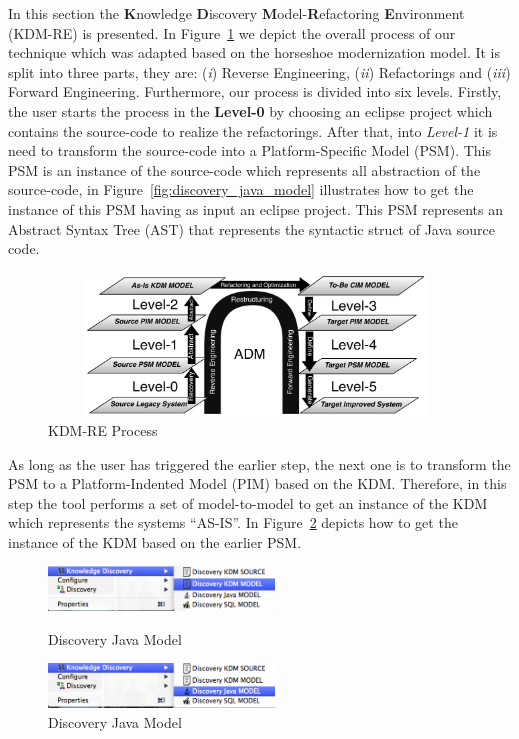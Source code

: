 In this section the \textbf{K}nowledge \textbf{D}iscovery \textbf{M}odel-\textbf{R}efactoring \textbf{E}nvironment (KDM-RE) is presented. 
In Figure~\ref{fig:process} we depict the overall process of our technique which was adapted based on the horseshoe modernization model. 
It is split into three parts, they are: 
(\textit{i}) Reverse Engineering, 
(\textit{ii}) Refactorings and 
(\textit{iii}) Forward Engineering. 
Furthermore, our process is divided into six levels. 
Firstly, the user starts the process in the \textbf{Level-0} by choosing an eclipse project which contains the source-code to realize the refactorings.  
After that, into \textit{Level-1} it is need to transform the source-code into a Platform-Specific Model (PSM). 
This PSM is an instance of the source-code which represents all abstraction of the source-code, in Figure~\ref{fig:discovery_java_model} illustrates how to get the instance of this PSM having as input an eclipse project. 
This PSM represents an Abstract Syntax Tree (AST) that represents the syntactic struct of Java source code.

\begin{figure}[!ht]
\centering
  \includegraphics[width=11cm, height=3.8cm]{figure/processoDaFerramenta}
\caption{KDM-RE Process}
\label{fig:process}
\end{figure} 

As long as the user has triggered the earlier step, the next one is to transform the PSM to a Platform-Indented Model (PIM) based on the KDM. 
Therefore, in this step the tool performs a set of model-to-model to get an instance of the KDM which represents the systems ``AS-IS''. 
In Figure~\ref{fig:discovery_kdm_model} depicts how to get the instance of the KDM based on the earlier PSM.

\begin{figure}
\centering
\begin{minipage}{.5\textwidth}
  \centering
  \includegraphics[width=6cm]{figure/discovery_kdm_model}
  \caption{Discovery Java Model}
  \label{fig:discovery_java_model}
\end{minipage}%
\begin{minipage}{.5\textwidth}
  \centering
  \includegraphics[width=6cm]{figure/discovery_java_model}
  \caption{Discovery Java Model}
  \label{fig:discovery_kdm_model}
\end{minipage}
\end{figure}

